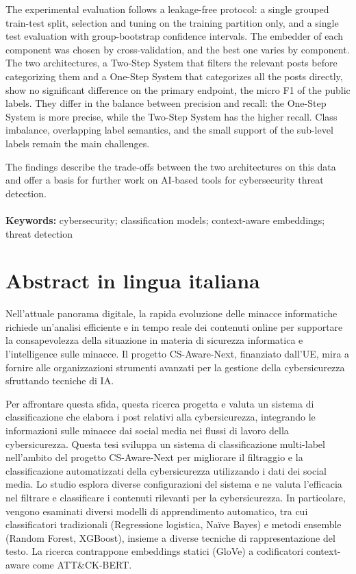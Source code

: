 \documentclass{Configuration_Files/PoliMi3i_thesis}
\begin{document}
The experimental evaluation follows a leakage-free protocol: a single grouped train-test split, selection and tuning on the training partition only, and a single test evaluation with group-bootstrap confidence intervals. The embedder of each component was chosen by cross-validation, and the best one varies by component. The two architectures, a Two-Step System that filters the relevant posts before categorizing them and a One-Step System that categorizes all the posts directly, show no significant difference on the primary endpoint, the micro F1 of the public labels. They differ in the balance between precision and recall: the One-Step System is more precise, while the Two-Step System has the higher recall. Class imbalance, overlapping label semantics, and the small support of the sub-level labels remain the main challenges.

The findings describe the trade-offs between the two architectures on this data and offer a basis for further work on AI-based tools for cybersecurity threat detection.
\\
\\
\textbf{Keywords:} cybersecurity; classification models; context-aware embeddings; threat detection %

\chapter*{Abstract in lingua italiana}
Nell'attuale panorama digitale, la rapida evoluzione delle minacce informatiche richiede un'analisi efficiente e in tempo reale dei contenuti online per supportare la consapevolezza della situazione in materia di sicurezza informatica e l'intelligence sulle minacce. Il progetto CS-Aware-Next, finanziato dall'UE, mira a fornire alle organizzazioni strumenti avanzati per la gestione della cybersicurezza sfruttando tecniche di IA.

Per affrontare questa sfida, questa ricerca progetta e valuta un sistema di classificazione che elabora i post relativi alla cybersicurezza, integrando le informazioni sulle minacce dai social media nei flussi di lavoro della cybersicurezza. Questa tesi sviluppa un sistema di classificazione multi-label nell'ambito del progetto CS-Aware-Next per migliorare il filtraggio e la classificazione automatizzati della cybersicurezza utilizzando i dati dei social media. Lo studio esplora diverse configurazioni del sistema e ne valuta l'efficacia nel filtrare e classificare i contenuti rilevanti per la cybersicurezza. In particolare, vengono esaminati diversi modelli di apprendimento automatico, tra cui classificatori tradizionali (Regressione logistica, Naïve Bayes) e metodi ensemble (Random Forest, XGBoost), insieme a diverse tecniche di rappresentazione del testo. La ricerca contrappone embeddings statici (GloVe) a codificatori context-aware come ATT{\&}CK-BERT.
\end{document}
